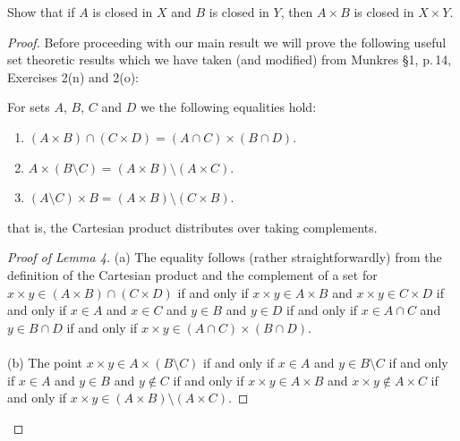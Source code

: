 \begin{problem}
Show that if $A$ is closed in $X$ and $B$ is closed in $Y$, then
$A\times B$ is closed in $X\times Y$.
\end{problem}
\begin{proof}
Before proceeding with our main result we will prove the
following useful set theoretic results which we have taken (and
modified) from Munkres \S1, p.\,14, Exercises 2(n) and 2(o):
\begin{lemma}
For sets $A$, $B$, $C$ and $D$ we the following equalities hold:
\begin{enumerate}[noitemsep,label=(\alph*)]
\item $(A\times B)\cap (C\times D)=(A\cap C)\times (B\cap D)$.
\item $A\times (B\setminus C)=(A\times B)\setminus (A\times C)$.
\item $(A\setminus C)\times B=(A\times B)\setminus (C\times B)$.
\end{enumerate}
that is, the Cartesian product distributes over taking
complements.
\end{lemma}
\begin{proof}[Proof of Lemma 4]
\renewcommand\qedsymbol{$\clubsuit$}
(a) The equality follows (rather straightforwardly) from the
definition of the Cartesian product and the complement of a set
for $x\times y\in (A\times B)\cap (C\times D)$ if and only if
$x\times y\in A\times B$ and $x\times y\in C\times D$ if and only
if $x\in A$ and $x\in C$ and $y\in B$ and $y\in D$ if and only if
$x\in A\cap C$ and $y\in B\cap D$ if and only if $x\times y\in
(A\cap C)\times (B\cap D)$.
\\\\
(b) The point $x\times y\in A\times (B\setminus C)$ if and only
if $x\in A$ and $y\in B\setminus C$ if and only if $x\in A$ and
$y\in B$ and $y\notin C$ if and only if $x\times y\in A\times B$
and $x\times y\notin A\times C$ if and only if $x\times y\in
(A\times B)\setminus (A\times C)$.

\end{proof}
\end{proof}

